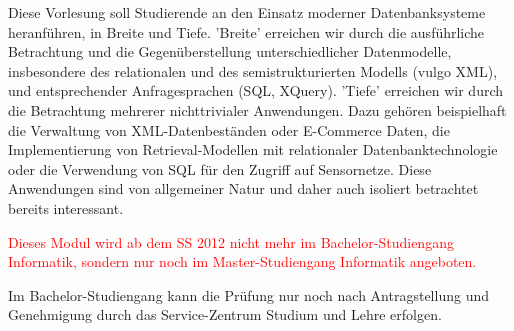 \begin{module}
\begin{content}
Diese Vorlesung soll Studierende an den Einsatz moderner Datenbanksysteme heranführen, in Breite und Tiefe. ’Breite’ erreichen wir durch die ausführliche Betrachtung und die Gegenüberstellung unterschiedlicher Datenmodelle, insbesondere des relationalen und des semistrukturierten Modells (vulgo XML), und entsprechender Anfragesprachen (SQL, XQuery). ’Tiefe’ erreichen wir durch die Betrachtung mehrerer nichttrivialer Anwendungen. Dazu gehören beispielhaft die Verwaltung von XML-Datenbeständen oder E-Commerce Daten, die Implementierung von Retrieval-Modellen mit relationaler Datenbanktechnologie oder die Verwendung von SQL für den Zugriff auf Sensornetze. Diese Anwendungen sind von allgemeiner Natur und daher auch isoliert betrachtet bereits interessant.


\end{content}

\begin{remarks}\textcolor{red}{Dieses Modul wird ab dem SS 2012 nicht mehr im Bachelor-Studiengang Informatik, sondern nur noch im Master-Studiengang Informatik angeboten.}

 

Im Bachelor-Studiengang kann die Prüfung nur noch nach Antragstellung und Genehmigung durch das Service-Zentrum Studium und Lehre erfolgen.

\end{remarks}

\end{module}

